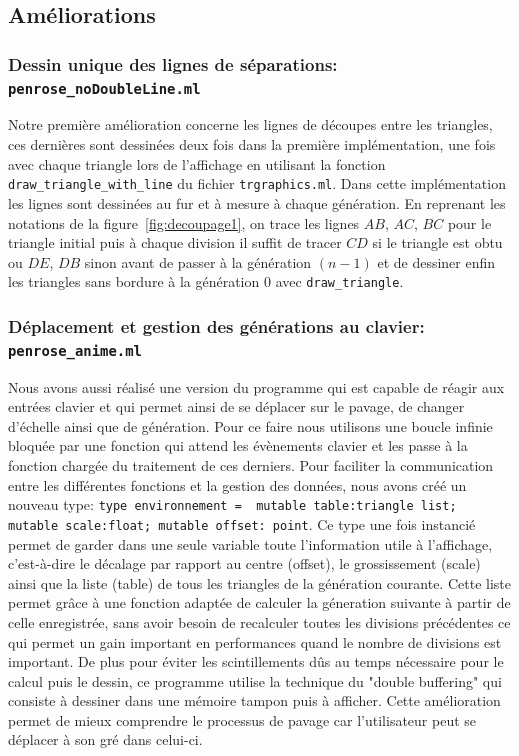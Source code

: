 \documentclass[a4paper,13pt]{article}
\begin{document}
\subsection{Améliorations}

\subsubsection{Dessin unique des lignes de séparations: \texttt{penrose\_noDoubleLine.ml}}
Notre première amélioration concerne les lignes de découpes entre les triangles, ces dernières sont dessinées deux fois dans la première implémentation, une fois avec chaque triangle lors de l'affichage en utilisant la fonction \texttt{draw_triangle_with_line} du fichier \texttt{trgraphics.ml}. Dans cette implémentation les lignes sont dessinées au fur et à mesure à chaque génération. En reprenant les notations de la figure~\ref{fig:decoupage1}, on trace les lignes $AB$, $AC$, $BC$ pour le triangle initial puis à chaque division il suffit de tracer $CD$ si le triangle est obtu ou $DE$, $DB$ sinon avant de passer à la génération $(n-1)$ et de dessiner enfin les triangles sans bordure à la génération $0$ avec \texttt{draw_triangle}.

\subsubsection{Déplacement et gestion des générations au clavier: \texttt{penrose\_anime.ml}}

Nous avons aussi réalisé une version du programme qui est capable de réagir aux entrées clavier et qui permet ainsi de se déplacer sur le pavage, de changer d'échelle ainsi que de génération. Pour ce faire nous utilisons une boucle infinie bloquée par une fonction qui attend les évènements clavier et les passe à la fonction chargée du traitement de ces derniers. Pour faciliter la communication entre les différentes fonctions et la gestion des données, nous avons créé un nouveau type: \texttt{type environnement =
{ mutable table:triangle list; mutable scale:float; mutable offset: point}}. Ce type une fois instancié permet de garder dans une seule variable toute l'information utile à l'affichage, c'est-à-dire le décalage par rapport au centre (offset), le grossissement (scale) ainsi que la liste (table) de tous les triangles de la génération courante. Cette liste permet grâce à une fonction adaptée de calculer la géneration suivante à partir de celle enregistrée, sans avoir besoin de recalculer toutes les divisions précédentes ce qui permet un gain important en performances quand le nombre de divisions est important. De plus pour éviter les scintillements dûs au temps nécessaire pour le calcul puis le dessin, ce programme utilise la technique du "double buffering" qui consiste à dessiner dans une mémoire tampon puis à afficher. Cette amélioration permet de mieux comprendre le processus de pavage car l'utilisateur peut se déplacer à son gré dans celui-ci.
\end{document}
